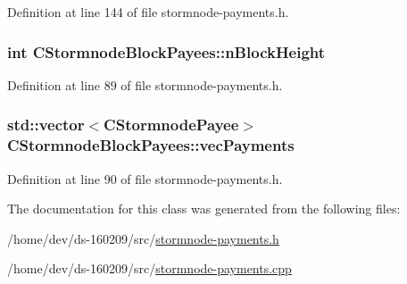 Definition at line 144 of file stormnode-\/payments.\+h.

\hypertarget{class_c_stormnode_block_payees_a416f3766bb7df6d02f83f0eb34aafe62}{}
\subsubsection[{n\+Block\+Height}]{\setlength{\rightskip}{0pt plus 5cm}int C\+Stormnode\+Block\+Payees\+::n\+Block\+Height}\label{class_c_stormnode_block_payees_a416f3766bb7df6d02f83f0eb34aafe62}


Definition at line 89 of file stormnode-\/payments.\+h.

\hypertarget{class_c_stormnode_block_payees_ac60f49701f0c229b4ff6dfaad6d3af36}{}
\subsubsection[{vec\+Payments}]{\setlength{\rightskip}{0pt plus 5cm}std\+::vector$<${\bf C\+Stormnode\+Payee}$>$ C\+Stormnode\+Block\+Payees\+::vec\+Payments}\label{class_c_stormnode_block_payees_ac60f49701f0c229b4ff6dfaad6d3af36}


Definition at line 90 of file stormnode-\/payments.\+h.



The documentation for this class was generated from the following files\+:\begin{DoxyCompactItemize}
\item 
/home/dev/ds-\/160209/src/\hyperlink{stormnode-payments_8h}{stormnode-\/payments.\+h}\item 
/home/dev/ds-\/160209/src/\hyperlink{stormnode-payments_8cpp}{stormnode-\/payments.\+cpp}\end{DoxyCompactItemize}
